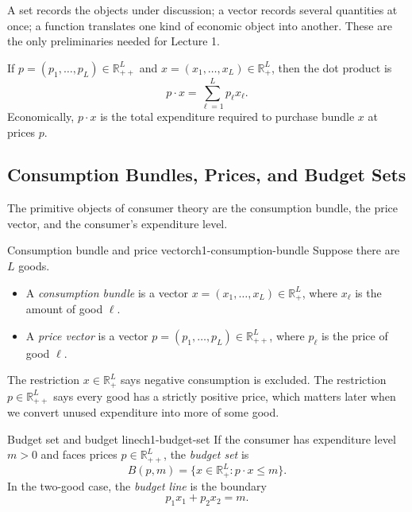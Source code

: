 A set records the objects under discussion; a vector records several quantities at once; a function translates one kind of economic object into another. These are the only preliminaries needed for Lecture 1.

\begin{keyformula}[title={Key Formula: Dot Product and Expenditure}]
If $p = (p_1,\dots,p_L) \in \mathbb{R}^L_{++}$ and $x = (x_1,\dots,x_L) \in \mathbb{R}^L_+$, then the dot product is
\[
p \cdot x = \sum_{\ell=1}^{L} p_\ell x_\ell.
\]
Economically, $p \cdot x$ is the total expenditure required to purchase bundle $x$ at prices $p$.
\end{keyformula}

\subsection{Consumption Bundles, Prices, and Budget Sets}

The primitive objects of consumer theory are the consumption bundle, the price vector, and the consumer's expenditure level.

\begin{definition}{Consumption bundle and price vector}{ch1-consumption-bundle}
Suppose there are $L$ goods.
\begin{itemize}
    \item A \emph{consumption bundle} is a vector $x = (x_1,\dots,x_L) \in \mathbb{R}^L_+$, where $x_\ell$ is the amount of good $\ell$.
    \item A \emph{price vector} is a vector $p = (p_1,\dots,p_L) \in \mathbb{R}^L_{++}$, where $p_\ell$ is the price of good $\ell$.
\end{itemize}
\end{definition}

The restriction $x \in \mathbb{R}^L_+$ says negative consumption is excluded. The restriction $p \in \mathbb{R}^L_{++}$ says every good has a strictly positive price, which matters later when we convert unused expenditure into more of some good.

\begin{definition}{Budget set and budget line}{ch1-budget-set}
If the consumer has expenditure level $m > 0$ and faces prices $p \in \mathbb{R}^L_{++}$, the \emph{budget set} is
\[
B(p,m) = \{x \in \mathbb{R}^L_+ : p \cdot x \le m\}.
\]
In the two-good case, the \emph{budget line} is the boundary
\[
p_1 x_1 + p_2 x_2 = m.
\]
\end{definition}

